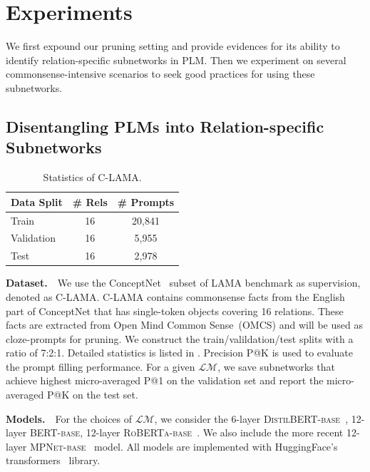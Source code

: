 
\section{Experiments}
We first expound our pruning setting
and provide evidences for its ability to identify relation-specific subnetworks in PLM.
Then we experiment on several commonsense-intensive scenarios to seek 
good practices for using these subnetworks.

\subsection{Disentangling PLMs into Relation-specific Subnetworks}
\label{sec:LAMA}
\begin{table}[!h]
	\centering
	\small
	\begin{tabular}{l|cc}
		\toprule
		\textbf{Data Split} & \textbf{\# Rels} & \textbf{\# Prompts} \\
		\midrule
		Train  & 16 &  20,841\\
		Validation   & 16 &  5,955\\
		Test   & 16 &  2,978\\
		\bottomrule
	\end{tabular}
	\caption{Statistics of C-LAMA.}
	\label{table:conceptnet}
\end{table}
\noindent
\textbf{Dataset.}~~We use the ConceptNet~\citep{speer-havasi-2012-representing} subset of LAMA benchmark as supervision, denoted as C-LAMA.
C-LAMA contains commonsense facts from the English part of ConceptNet that has
single-token objects covering 16 relations. These facts are extracted from Open Mind Common Sense~(OMCS) and will be used as cloze-prompts for pruning. We construct the train/valildation/test splits with a ratio of 7:2:1. Detailed statistics is listed in . Precision P@K is used to evaluate the prompt filling performance. For a given $\mathcal{LM}$, we save subnetworks that achieve highest micro-averaged P@1 on the validation set and report the micro-averaged P@K on the test set.


\noindent
\textbf{Models.}~~For the choices of $\mathcal{LM}$, we consider the 6-layer \textsc{DistilBERT-base}~\citep{DBLP:journals/corr/abs-1910-01108}, 12-layer \textsc{BERT-base}, 12-layer \textsc{RoBERTa-base}~\citep{DBLP:journals/corr/abs-1907-11692}. We also include the more recent 12-layer \textsc{MPNet-base}~\citep{song2020mpnet} model. All models are implemented with HuggingFace's transformers~\citep{DBLP:journals/corr/abs-1910-03771} library. 

